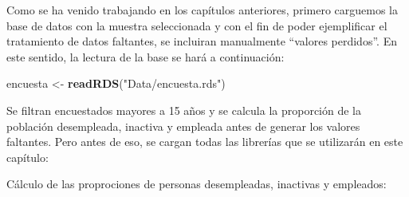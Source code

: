 \documentclass[
  12pt,
]{book}
\newenvironment{Shaded}{\begin{snugshade}}{\end{snugshade}}
\newcommand{\AttributeTok}[1]{\textcolor[rgb]{0.13,0.29,0.53}{#1}}
\newcommand{\CommentTok}[1]{\textcolor[rgb]{0.56,0.35,0.01}{\textit{#1}}}
\newcommand{\ConstantTok}[1]{\textcolor[rgb]{0.56,0.35,0.01}{#1}}
\newcommand{\DecValTok}[1]{\textcolor[rgb]{0.00,0.00,0.81}{#1}}
\newcommand{\FunctionTok}[1]{\textcolor[rgb]{0.13,0.29,0.53}{\textbf{#1}}}
\newcommand{\NormalTok}[1]{#1}
\newcommand{\OtherTok}[1]{\textcolor[rgb]{0.56,0.35,0.01}{#1}}
\newcommand{\SpecialCharTok}[1]{\textcolor[rgb]{0.81,0.36,0.00}{\textbf{#1}}}
\newcommand{\StringTok}[1]{\textcolor[rgb]{0.31,0.60,0.02}{#1}}
\begin{document}
Como se ha venido trabajando en los capítulos anteriores, primero carguemos la base de datos con la muestra seleccionada y con el fin de poder ejemplificar el tratamiento de datos faltantes, se incluiran manualmente ``valores perdidos''. En este sentido, la lectura de la base se hará a continuación:

\begin{Shaded}
\begin{Highlighting}[]
\NormalTok{encuesta }\OtherTok{\textless{}{-}} \FunctionTok{readRDS}\NormalTok{(}\StringTok{"Data/encuesta.rds"}\NormalTok{) }
\end{Highlighting}
\end{Shaded}

Se filtran encuestados mayores a 15 años y se calcula la proporción de la población desempleada, inactiva y empleada antes de generar los valores faltantes. Pero antes de eso, se cargan todas las librerías que se utilizarán en este capítulo:

\begin{Shaded}
\end{Shaded}

Cálculo de las proprociones de personas desempleadas, inactivas y empleados:

\begin{Shaded}
\end{Shaded}
\end{document}
